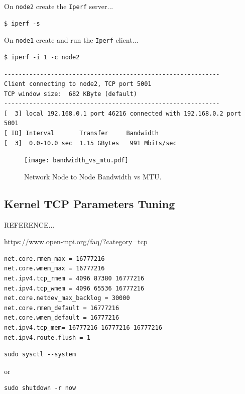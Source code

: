 \documentclass{report}
\begin{document}
On \verb|node2| create the \verb|Iperf| server...

\lstset{style=type}
\begin{lstlisting}
$ iperf -s
\end{lstlisting}

On \verb|node1| create and run the \verb|Iperf| client...

\lstset{style=type}
\begin{lstlisting}
$ iperf -i 1 -c node2
\end{lstlisting}

\lstset{style=type}
\begin{lstlisting}
------------------------------------------------------------
Client connecting to node2, TCP port 5001
TCP window size:  682 KByte (default)
------------------------------------------------------------
[  3] local 192.168.0.1 port 46216 connected with 192.168.0.2 port 5001
[ ID] Interval       Transfer     Bandwidth
[  3]  0.0-10.0 sec  1.15 GBytes   991 Mbits/sec
\end{lstlisting}


\begin{figure}
	\centering	
	\texttt{[image: bandwidth\_vs\_mtu.pdf]}
	\caption{Network Node to Node Bandwidth vs MTU.}
\end{figure}


\subsection{Kernel TCP Parameters Tuning}

REFERENCE...

https://www.open-mpi.org/faq/?category=tcp

\lstset{style=listing}
\begin{lstlisting}[caption=/etc/sysctl.d/picluster.conf]
net.core.rmem_max = 16777216
net.core.wmem_max = 16777216
net.ipv4.tcp_rmem = 4096 87380 16777216
net.ipv4.tcp_wmem = 4096 65536 16777216
net.core.netdev_max_backlog = 30000
net.core.rmem_default = 16777216
net.core.wmem_default = 16777216
net.ipv4.tcp_mem= 16777216 16777216 16777216
net.ipv4.route.flush = 1
\end{lstlisting}


\lstset{style=type}
\begin{lstlisting}
sudo sysctl --system
\end{lstlisting}

or

\lstset{style=type}
\begin{lstlisting}
sudo shutdown -r now
\end{lstlisting}
\end{document}
